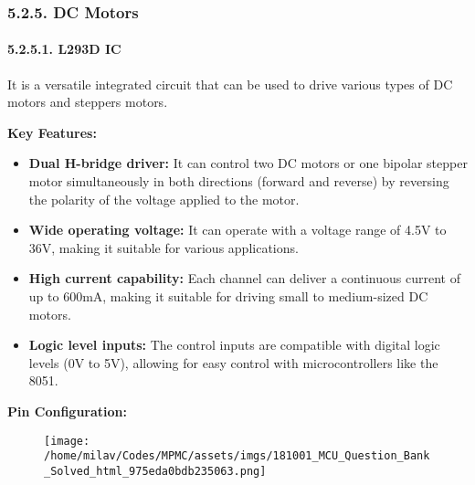 \documentclass[
]{article}
\begin{document}
\hypertarget{525-dc-motors}{%
\subsubsection{5.2.5. DC Motors}\label{525-dc-motors}}

\hypertarget{5251-l293d-ic}{%
\paragraph{5.2.5.1. L293D IC}\label{5251-l293d-ic}}

It is a versatile integrated circuit that can be used to drive various
types of DC motors and steppers motors.

\textbf{Key Features:}

\begin{itemize}
\item
  \textbf{Dual H-bridge driver:} It can control two DC motors or one
  bipolar stepper motor simultaneously in both directions (forward and
  reverse) by reversing the polarity of the voltage applied to the
  motor.
\item
  \textbf{Wide operating voltage:} It can operate with a voltage range
  of 4.5V to 36V, making it suitable for various applications.
\item
  \textbf{High current capability:} Each channel can deliver a
  continuous current of up to 600mA, making it suitable for driving
  small to medium-sized DC motors.
\item
  \textbf{Logic level inputs:} The control inputs are compatible with
  digital logic levels (0V to 5V), allowing for easy control with
  microcontrollers like the 8051.
\end{itemize}

\textbf{Pin Configuration:}

\begin{figure}
\centering
\texttt{[image: /home/milav/Codes/MPMC/assets/imgs/181001\_MCU\_Question\_Bank\_Solved\_html\_975eda0bdb235063.png]}
\caption{}
\end{figure}
\end{document}
